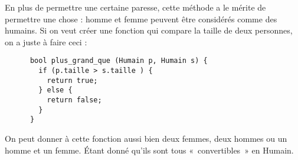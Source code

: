     En plus de permettre une certaine paresse, cette méthode a le mérite de permettre une chose : homme et femme peuvent être considérés comme des humains. Si on veut créer une fonction qui compare la taille de deux 
    personnes, on a juste à faire ceci :
    \begin{lstlisting}
      bool plus_grand_que (Humain p, Humain s) {
        if (p.taille > s.taille ) {
          return true;
        } else {
          return false;
        }
      }
    \end{lstlisting}
    
    On peut donner à cette fonction aussi bien deux femmes, deux hommes ou un homme et un femme. Étant donné qu'ils sont tous «~convertibles~» en Humain.

